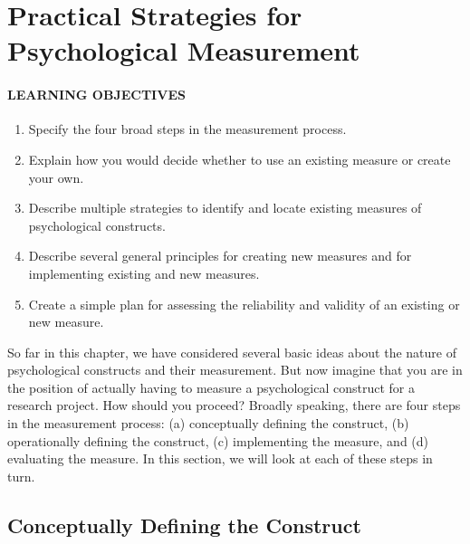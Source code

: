 \documentclass[
]{krantz}
\providecommand{\tightlist}{%
  \setlength{\itemsep}{0pt}\setlength{\parskip}{0pt}}
\begin{document}
\section{Practical Strategies for Psychological Measurement}\label{practical-strategies-for-psychological-measurement}

\paragraph*{LEARNING OBJECTIVES}\label{learning-objectives-11}

\begin{enumerate}
\def\labelenumi{\arabic{enumi}.}
\tightlist
\item
  Specify the four broad steps in the measurement process.
\item
  Explain how you would decide whether to use an existing measure or create your own.
\item
  Describe multiple strategies to identify and locate existing measures of psychological constructs.
\item
  Describe several general principles for creating new measures and for implementing existing and new measures.
\item
  Create a simple plan for assessing the reliability and validity of an existing or new measure.
\end{enumerate}

So far in this chapter, we have considered several basic ideas about the nature of psychological constructs and their measurement. But now imagine that you are in the position of actually having to measure a psychological construct for a research project. How should you proceed? Broadly speaking, there are four steps in the measurement process: (a) conceptually defining the construct, (b) operationally defining the construct, (c) implementing the measure, and (d) evaluating the measure. In this section, we will look at each of these steps in turn.

\subsection*{Conceptually Defining the Construct}\label{conceptually-defining-the-construct}
\end{document}
